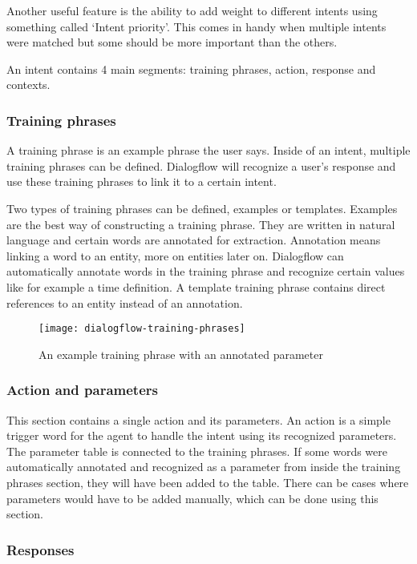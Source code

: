 Another useful feature is the ability to add weight to different intents using something called `Intent priority'. This comes in handy when multiple intents were matched but some should be more important than the others.

An intent contains 4 main segments: training phrases, action, response and contexts.

\subsubsection{Training phrases}

A training phrase is an example phrase the user says. Inside of an intent, multiple training phrases can be defined. Dialogflow will recognize a user's response and use these training phrases to link it to a certain intent.

Two types of training phrases can be defined, examples or templates. Examples are the best way of constructing a training phrase. They are written in natural language and certain words are annotated for extraction. Annotation means linking a word to an entity, more on entities later on. Dialogflow can automatically annotate words in the training phrase and recognize certain values like for example a time definition. A template training phrase contains direct references to an entity instead of an annotation.

\begin{figure}[ht]
	\centering
	\texttt{[image: dialogflow-training-phrases]}\label{fig:dialogflow-training-phrases}
	\caption{An example training phrase with an annotated parameter}
\end{figure}

\subsubsection{Action and parameters}

This section contains a single action and its parameters. An action is a simple trigger word for the agent to handle the intent using its recognized parameters. The parameter table is connected to the training phrases. If some words were automatically annotated and recognized as a parameter from inside the training phrases section, they will have been added to the table. There can be cases where parameters would have to be added manually, which can be done using this section.

\subsubsection{Responses}

